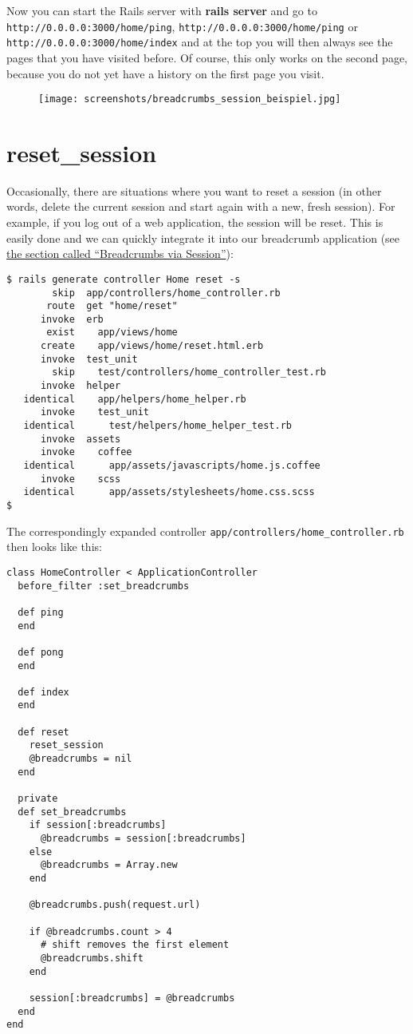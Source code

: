 \documentclass[a4paper]{book}
\newcommand{\chap}[1]{\newpage\thispagestyle{empty}\chapter{#1}\label{chap:\thechapter}}
\begin{document}
Now you can start the Rails server with \textbf{rails server} and go to \texttt{http://0.0.0.0:3000/home/ping}, \texttt{http://0.0.0.0:3000/home/ping} or \texttt{http://0.0.0.0:3000/home/index} and at the top you will then always see the pages that you have visited before. Of course, this only works on the second page, because you do not yet have a history on the first page you visit.

\begin{figure}[htbp]
\centering
\texttt{[image: screenshots/breadcrumbs\_session\_beispiel.jpg]}
\end{figure}

\chap{reset\_session}\label{resetux5fsession}

Occasionally, there are situations where you want to reset a session (in other words, delete the current session and start again with a new, fresh session). For example, if you log out of a web application, the session will be reset. This is easily done and we can quickly integrate it into our breadcrumb application (see \hyperref[sessionux5fbreadcrumbs]{the section called “Breadcrumbs via Session”}):

\begin{shaded}\begin{verbatim}
$ rails generate controller Home reset -s
        skip  app/controllers/home_controller.rb
       route  get "home/reset"
      invoke  erb
       exist    app/views/home
      create    app/views/home/reset.html.erb
      invoke  test_unit
        skip    test/controllers/home_controller_test.rb
      invoke  helper
   identical    app/helpers/home_helper.rb
      invoke    test_unit
   identical      test/helpers/home_helper_test.rb
      invoke  assets
      invoke    coffee
   identical      app/assets/javascripts/home.js.coffee
      invoke    scss
   identical      app/assets/stylesheets/home.css.scss
$
\end{verbatim}\end{shaded}

The correspondingly expanded controller \texttt{app/controllers/home\_controller.rb} then looks like this:

\begin{shaded}\begin{verbatim}
class HomeController < ApplicationController
  before_filter :set_breadcrumbs

  def ping
  end

  def pong
  end

  def index
  end

  def reset
    reset_session
    @breadcrumbs = nil
  end

  private
  def set_breadcrumbs
    if session[:breadcrumbs]
      @breadcrumbs = session[:breadcrumbs]
    else
      @breadcrumbs = Array.new
    end

    @breadcrumbs.push(request.url)

    if @breadcrumbs.count > 4
      # shift removes the first element
      @breadcrumbs.shift
    end

    session[:breadcrumbs] = @breadcrumbs
  end
end
\end{verbatim}\end{shaded}
\end{document}
